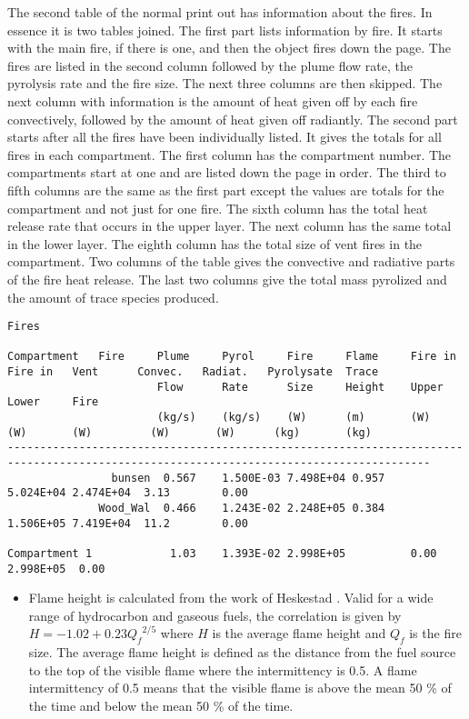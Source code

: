 The second table of the normal print out has information about the fires.  In essence it is two tables joined.  The first part lists information by fire.  It starts with the main fire, if there is one, and then the object fires down the page.  The fires are listed in the second column followed by the plume flow rate, the pyrolysis rate and the fire size.  The next three columns are then skipped.  The next column with information is the amount of heat given off by each fire convectively, followed by the amount of heat given off radiantly.  The second part starts after all the fires have been individually listed.  It gives the totals for all fires in each compartment.  The first column has the compartment number.  The compartments start at one and are listed down the page in order.  The third to fifth columns are the same as the first part except the values are totals for the compartment and not just for one fire.  The sixth column has the total heat release rate that occurs in the upper layer.  The next column has the same total in the lower layer.  The eighth column has the total size of vent fires in the compartment.  Two columns of the table gives the convective and radiative parts of the fire heat release. The last two columns give the total mass pyrolized and the amount of trace species produced.

\begin{lstlisting}[basicstyle=\tiny]
Fires

Compartment   Fire     Plume     Pyrol     Fire     Flame     Fire in   Fire in   Vent      Convec.   Radiat.   Pyrolysate  Trace
                       Flow      Rate      Size     Height    Upper     Lower     Fire
                       (kg/s)    (kg/s)    (W)      (m)       (W)       (W)       (W)         (W)       (W)      (kg)       (kg)
---------------------------------------------------------------------------------------------------------------------------------------
                bunsen  0.567    1.500E-03 7.498E+04 0.957                                   5.024E+04 2.474E+04  3.13        0.00    
              Wood_Wal  0.466    1.243E-02 2.248E+05 0.384                                   1.506E+05 7.419E+04  11.2        0.00    

Compartment 1            1.03    1.393E-02 2.998E+05          0.00     2.998E+05  0.00
\end{lstlisting}

\begin{itemize}
\item Flame height is calculated from the work of Heskestad \cite{Heskestad:2002}. Valid for a wide range of hydrocarbon and gaseous fuels, the correlation is given by $H = -1.02 + 0.23{Q_f}^{2/5}$ where $H$ is the average flame height and $Q_f$ is the fire size. The average flame height is defined as the distance from the fuel source to the top of the visible flame where the intermittency is 0.5.  A flame intermittency of 0.5 means that the visible flame is above the mean 50 \% of the time and below the mean 50 \% of the time.
\end{itemize}

